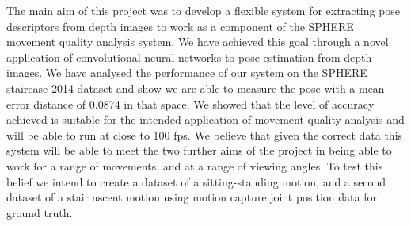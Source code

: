 \documentclass[11pt]{article} %
\begin{document}
The main aim of this project was to develop a flexible system for extracting pose descriptors from depth images to work as a component of the SPHERE movement quality analysis system. We have achieved this goal through a novel application of convolutional neural networks to pose estimation from depth images. We have analysed the performance of our system on the SPHERE staircase 2014 dataset and show we are able to measure the pose with a mean error distance of 0.0874 in that space. We showed that the level of accuracy achieved is suitable for the intended application of movement quality analysis and will be able to run at close to 100 fps. We believe that given the correct data this system will be able to meet the two further aims of the project in being able to work for a range of movements, and at a range of viewing angles. To test this belief we intend to create a dataset of a sitting-standing motion, and a second dataset of a stair ascent motion using motion capture joint position data for ground truth. 






%
\end{document}
